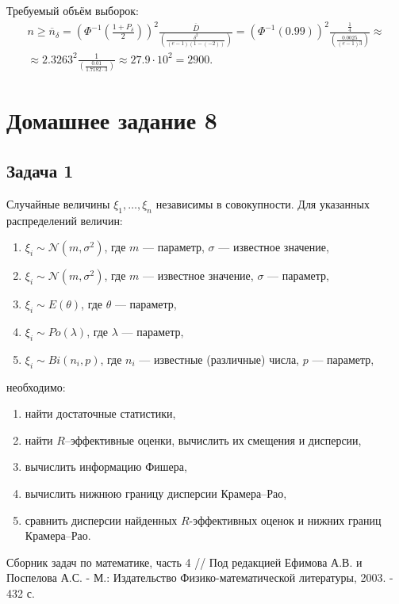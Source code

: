 \documentclass[a4paper,12pt]{article}
\begin{document}
    Требуемый объём выборок:
    \begin{multline*}
        n
        \ge \overline{n}_\delta
        = \left( \Phi^{-1} \left( \frac{1 + P_\delta}{2} \right) \right)^2 \frac{\overline{D}}{\left( \frac{\delta^2}{(e-1)(1-(-2))} \right)}
        = \left( \Phi^{-1} ( 0.99 ) \right)^2 \frac{\frac{1}{4}}{\left( \frac{0.0025}{(e-1) 3} \right)} \approx \\
        \approx 2.3263^2 \frac{1}{\left( \frac{0.01}{1.7182 \cdot 3} \right)}
        \approx 27.9 \cdot 10^2
        = 2 900 .
    \end{multline*}
\fi

\section*{Домашнее задание 8}

\subsection*{Задача 1}

Случайные величины $\xi_1, \dots, \xi_n$ независимы в совокупности. Для указанных распределений величин:
\begin{enumerate}
    \item $\xi_i \sim \mathcal{N}(m, \sigma^2)$, где $m$ --- параметр, $\sigma$ --- известное значение,
    \item $\xi_i \sim \mathcal{N}(m, \sigma^2)$, где $m$ --- известное значение, $\sigma$ --- параметр,
    \item $\xi_i \sim E(\theta)$, где $\theta$ --- параметр,
    \item $\xi_i \sim Po(\lambda)$, где $\lambda$ --- параметр,
    \item $\xi_i \sim Bi(n_i, p)$, где $n_i$ --- известные (различные) числа, $p$ --- параметр,
\end{enumerate}
необходимо:
\begin{enumerate}
    \item найти достаточные статистики,
    \item найти $R$--эффективные оценки, вычислить их смещения и дисперсии,
    \item вычислить информацию Фишера,
    \item вычислить нижнюю границу дисперсии Крамера--Рао,
    \item сравнить дисперсии найденных $R$-эффективных оценок и нижних границ Крамера--Рао.
\end{enumerate}

\begin{thebibliography}{1}
     Сборник задач по математике, часть 4 // Под редакцией Ефимова А.В. и Поспелова А.С. - М.: Издательство Физико-математической
    литературы, 2003. - 432 с.
\end{thebibliography}
\end{document}
